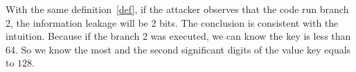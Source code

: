 \begin{table}[h]
    \centering
    \caption{The leaked information by the definition~\ref{def}}
\end{table}

With the same definition~\ref{def}, if the attacker observes that the code run branch 2, the information
leakage will be 2 bits. The conclusion is consistent with the intuition. Because if the branch 2 was
executed, we can know the key is less than 64. So we know the most and the second significant digits of 
the value key equals to $128$.

